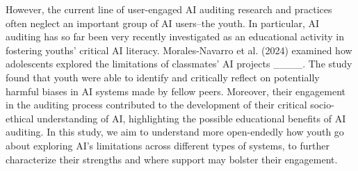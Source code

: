 However, the current line of user-engaged AI auditing research and practices often neglect an important group of AI users–the youth. In particular, AI auditing has so far been very recently investigated as an educational activity in fostering youths’ critical AI literacy. Morales-Navarro et al. (2024) examined how adolescents explored the limitations of classmates’ AI projects ____. The study found that youth were able to identify and critically reflect on potentially harmful biases in AI systems made by fellow peers. Moreover, their engagement in the auditing process contributed to the development of their critical socio-ethical understanding of AI, highlighting the possible educational benefits of AI auditing. In this study, we aim to understand more open-endedly how youth go about exploring AI’s limitations across different types of systems, to further characterize their strengths and where support may bolster their engagement. %